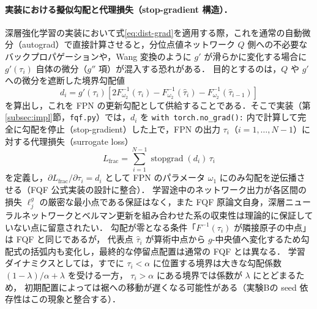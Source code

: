 \documentclass[a4paper,10pt]{jsarticle}
\theoremstyle{definition}
\newcommand{\Finv}{F^{-1}}
\begin{document}
\paragraph{実装における擬似勾配と代理損失（stop-gradient 構造）．}
深層強化学習の実装において式\eqref{eq:dist-grad}を適用する際，これを通常の自動微分（autograd）で直接計算させると，分位点値ネットワーク $Q$ 側への不必要なバックプロパゲーションや，Wang 変換のように $g'$ が滑らかに変化する場合に $g'(\tau_i)$ 自体の微分（$g''$ 項）が混入する恐れがある．
目的とするのは，$Q$ や $g'$ への微分を遮断した境界勾配値
\begin{equation}
  d_i = g'(\tau_i)\left[2\Finv_{\omega_2}(\tau_i) - \Finv_{\omega_2}(\hat\tau_i) - \Finv_{\omega_2}(\hat\tau_{i-1})\right]
  \label{eq:grad-val}
\end{equation}
を算出し，これを FPN の更新勾配として供給することである．そこで実装（第\ref{subsec:impl}節，\texttt{fqf.py}）では，$d_i$ を \texttt{with torch.no\_grad():} 内で計算して完全に勾配を停止（stop-gradient）した上で，FPN の出力 $\tau_i$（$i=1,\dots,N-1$）に対する代理損失（surrogate loss）
\begin{equation}
  L_{\mathrm{frac}} = \sum_{i=1}^{N-1} \operatorname{stopgrad}(d_i)\,\tau_i
  \label{eq:surrogate-loss}
\end{equation}
を定義し，$\partial L_{\mathrm{frac}}/\partial\tau_i = d_i$ として FPN のパラメータ $\omega_1$ にのみ勾配を逆伝播させる（FQF 公式実装の設計に整合）．
学習途中のネットワーク出力が各区間の損失 $\ell_j^g$ の厳密な最小点である保証はなく，また FQF 原論文自身，深層ニューラルネットワークとベルマン更新を組み合わせた系の収束性は理論的に保証していない点に留意されたい．
勾配が零となる条件「$\Finv(\tau_i)$ が隣接原子の中点」は FQF と同じであるが，
代表点 $\hat\tau_i$ が算術中点から $g$-中央値へ変化するため勾配式の括弧内も変化し，最終的な停留点配置は通常の FQF とは異なる．
学習ダイナミクスとしては，すでに $\tau_i<\alpha$ に位置する境界は大きな勾配係数 $(1-\lambda)/\alpha+\lambda$ を受ける一方，
$\tau_i>\alpha$ にある境界では係数が $\lambda$ にとどまるため，
初期配置によっては裾への移動が遅くなる可能性がある（実験Bの seed 依存性はこの現象と整合する）．
\end{document}
